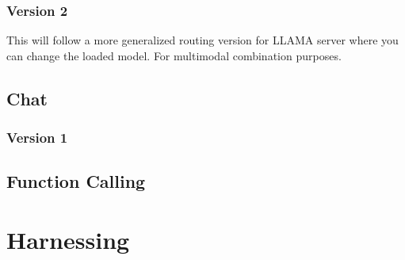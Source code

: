 \documentclass[12pt, a4paper, oneside]{report}
\begin{document}
	\subsection{Version 2}

	This will follow a more generalized routing version for LLAMA server where you can change the loaded model.
	For multimodal combination purposes.

	\section{Chat}

	\subsection{Version 1}

	\section{Function Calling}

	\chapter{Harnessing}\label{ch:harnessing}
\end{document}
